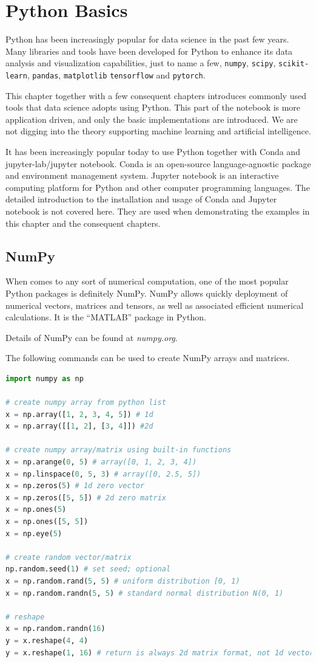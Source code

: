 \chapter{Python Basics} \label{ch:numpyscipy}

Python has been increasingly popular for data science in the past few years. Many libraries and tools have been developed for Python to enhance its data analysis and visualization capabilities, just to name a few, \verb|numpy|, \verb|scipy|, \verb|scikit-learn|, \verb|pandas|, \verb|matplotlib| \verb|tensorflow| and \verb|pytorch|.

This chapter together with a few consequent chapters introduces commonly used tools that data science adopts using Python. This part of the notebook is more application driven, and only the basic implementations are introduced. We are not digging into the theory supporting machine learning and artificial intelligence.

It has been increasingly popular today to use Python together with Conda and jupyter-lab/jupyter notebook. Conda is an open-source language-agnostic package and environment management system. Jupyter notebook is an interactive computing platform for Python and other computer programming languages. The detailed introduction to the installation and usage of Conda and Jupyter notebook is not covered here. They are used when demonstrating the examples in this chapter and the consequent chapters.

\section{NumPy}

When comes to any sort of numerical computation, one of the most popular Python packages is definitely NumPy. NumPy allows quickly deployment of numerical vectors, matrices and tensors, as well as associated efficient numerical calculations. It is the ``MATLAB'' package in Python.

Details of NumPy can be found at \textit{numpy.org}.

The following commands can be used to create NumPy arrays and matrices.
\begin{lstlisting}[language=Python]
import numpy as np

# create numpy array from python list
x = np.array([1, 2, 3, 4, 5]) # 1d
x = np.array([[1, 2], [3, 4]]) #2d

# create numpy array/matrix using built-in functions
x = np.arange(0, 5) # array([0, 1, 2, 3, 4])
x = np.linspace(0, 5, 3) # array([0, 2.5, 5])
x = np.zeros(5) # 1d zero vector
x = np.zeros([5, 5]) # 2d zero matrix
x = np.ones(5)
x = np.ones([5, 5])
x = np.eye(5)

# create random vector/matrix
np.random.seed(1) # set seed; optional
x = np.random.rand(5, 5) # uniform distribution [0, 1)
x = np.random.randn(5, 5) # standard normal distribution N(0, 1)

# reshape
x = np.random.randn(16)
y = x.reshape(4, 4)
y = x.reshape(1, 16) # return is always 2d matrix format, not 1d vector format
\end{lstlisting}

